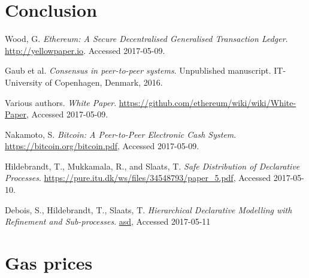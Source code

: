 \documentclass{article}
\begin{document}
	\section{Conclusion}

	\pagebreak
	
	\begin{thebibliography}{99}

		Wood, G.
		\textit{Ethereum: A Secure Decentralised Generalised Transaction Ledger}. 
		\url{http://yellowpaper.io}.
		Accessed 2017-05-09.

		Gaub et al.
		\textit{Consensus in peer-to-peer systems}.
		Unpublished manuscript.
		IT-University of Copenhagen,
		Denmark,
		2016.

		Various authors.
		\textit{White Paper}.
		\url{https://github.com/ethereum/wiki/wiki/White-Paper},
		Accessed 2017-05-09.

		Nakamoto, S.
		\textit{Bitcoin: A Peer-to-Peer Electronic Cash System}.
		\url{https://bitcoin.org/bitcoin.pdf},
		Accessed 2017-05-09.

		Hildebrandt, T., Mukkamala, R., and  Slaats, T.
		\textit{Safe Distribution of Declarative Processes}.
		\url{https://pure.itu.dk/ws/files/34548793/paper_5.pdf},
		Accessed 2017-05-10.

		Debois, S., Hildebrandt, T., Slaats, T.
		\textit{Hierarchical Declarative Modelling with Refinement and Sub-processes}.
		\url{asd},
		Accessed 2017-05-11

	\end{thebibliography}

	\clearpage


	\appendix

	\section{Gas prices}
		\label{app:gas-prices}
\end{document}
